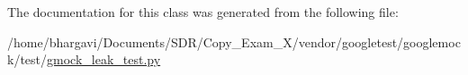 The documentation for this class was generated from the following file\+:\begin{DoxyCompactItemize}
\item 
/home/bhargavi/\+Documents/\+S\+D\+R/\+Copy\+\_\+\+Exam\+\_\+X/vendor/googletest/googlemock/test/\hyperlink{gmock__leak__test_8py}{gmock\+\_\+leak\+\_\+test.\+py}\end{DoxyCompactItemize}
